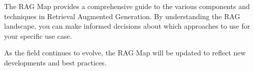 \documentclass[
  letterpaper,
  oneside]{scrbook}
\begin{document}
The RAG Map provides a comprehensive guide to the various components and
techniques in Retrieval Augmented Generation. By understanding the RAG
landscape, you can make informed decisions about which approaches to use
for your specific use case.

As the field continues to evolve, the RAG Map will be updated to reflect
new developments and best practices.


\backmatter
\end{document}
